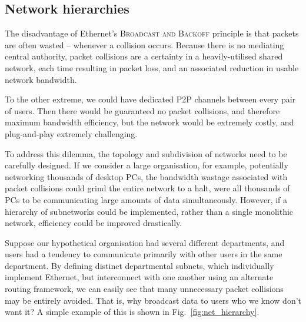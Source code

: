 \documentclass[aps, rmp, twocolumn, amsmath, amssymb, nofootinbib, superscriptaddress, longbibliography, floatfix, table-of-contents, eqsecnum]{revtex4-1}
\begin{document}
%
%

\subsection{Network hierarchies} 

The disadvantage of Ethernet's \textsc{Broadcast and Backoff} principle is that packets are often wasted -- whenever a collision occurs. Because there is no mediating central authority, packet collisions are a certainty in a heavily-utilised shared network, each time resulting in packet loss, and an associated reduction in usable network bandwidth.

To the other extreme, we could have dedicated P2P channels between every pair of users. Then there would be guaranteed no packet collisions, and therefore maximum bandwidth efficiency, but the network would be extremely costly, and plug-and-play extremely challenging.

To address this dilemma, the topology and subdivision of networks need to be carefully designed. If we consider a large organisation, for example, potentially networking thousands of desktop PCs, the bandwidth wastage associated with packet collisions could grind the entire network to a halt, were all thousands of PCs to be communicating large amounts of data simultaneously. However, if a hierarchy of subnetworks could be implemented, rather than a single monolithic network, efficiency could be improved drastically.

Suppose our hypothetical organisation had several different departments, and users had a tendency to communicate primarily with other users in the same department. By defining distinct departmental subnets, which individually implement Ethernet, but interconnect with one another using an alternate routing framework, we can easily see that many unnecessary packet collisions may be entirely avoided. That is, why broadcast data to users who we know don't want it? A simple example of this is shown in Fig.~\ref{fig:net_hierarchy}.
\end{document}

